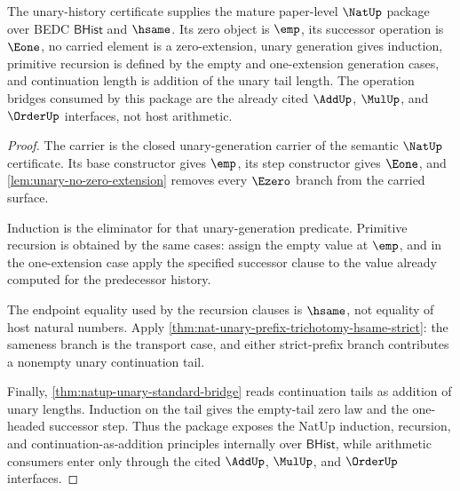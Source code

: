 \begin{theorem}
\label{thm:natup-mature-unary-recursion-package}
The unary-history certificate supplies the mature paper-level $\NatUp$ package
over BEDC $\mathsf{BHist}$ and $\hsame$. Its zero object is $\emp$, its
successor operation is $\Eone$, no carried element is a zero-extension, unary
generation gives induction, primitive recursion is defined by the empty and
one-extension generation cases, and continuation length is addition of the
unary tail length. The operation bridges consumed by this package are the
already cited $\AddUp$, $\MulUp$, and $\OrderUp$ interfaces, not host
arithmetic.
\end{theorem}
\begin{proof}
The carrier is the closed unary-generation carrier of the semantic
$\NatUp$ certificate. Its base constructor gives $\emp$, its step constructor
gives $\Eone$, and \autoref{lem:unary-no-zero-extension} removes every
$\Ezero$ branch from the carried surface.

Induction is the eliminator for that unary-generation predicate. Primitive
recursion is obtained by the same cases: assign the empty value at $\emp$, and
in the one-extension case apply the specified successor clause to the value
already computed for the predecessor history.

The endpoint equality used by the recursion clauses is $\hsame$, not equality
of host natural numbers. Apply
\autoref{thm:nat-unary-prefix-trichotomy-hsame-strict}: the sameness branch is
the transport case, and either strict-prefix branch contributes a nonempty
unary continuation tail.

Finally, \autoref{thm:natup-unary-standard-bridge} reads continuation tails as
addition of unary lengths. Induction on the tail gives the empty-tail zero law
and the one-headed successor step. Thus the package exposes the NatUp
induction, recursion, and continuation-as-addition principles internally over
$\mathsf{BHist}$, while arithmetic consumers enter only through the cited
$\AddUp$, $\MulUp$, and $\OrderUp$ interfaces.
\end{proof}
